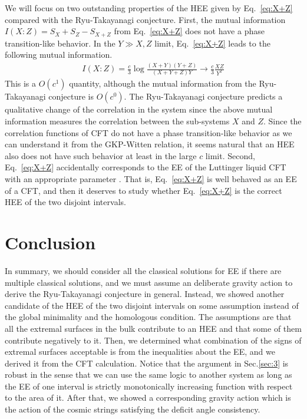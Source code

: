 \documentclass[%
 reprint,
 amsmath,amssymb,
 aps,
]{revtex4-2}
\begin{document}
    We will focus on two outstanding properties of the HEE given by Eq.~\eqref{eq:X+Z} compared with the Ryu-Takayanagi conjecture. First, the mutual information $I(X:Z) = S_X+S_Z-S_{X+Z}$ from Eq.~\eqref{eq:X+Z} does not have a phase transition-like behavior. In the $Y \gg X,Z$ limit, Eq.~\eqref{eq:X+Z} leads to the following mutual information.
\begin{align}
    I(X:Z) = \frac{c}{3}\log \frac{(X+Y)(Y+Z)}{(X+Y+Z)Y} \longrightarrow \frac{c}{3} \frac{X Z}{Y^2}
\end{align}
    This is a $O(c^1)$ quantity, although the mutual information from the Ryu-Takayanagi conjecture is $O(c^0)$. The Ryu-Takayanagi conjecture predicts a qualitative change of the correlation in the system since the above mutual information measures the correlation between the sub-systems $X$ and $Z$. Since the correlation functions of CFT do not have a phase transition-like behavior as we can understand it from the GKP-Witten relation, it seems natural that an HEE also does not have such behavior at least in the large $c$ limit. Second, Eq.~\eqref{eq:X+Z} accidentally corresponds to the EE of the Luttinger liquid CFT with an appropriate parameter \cite{Calabrese:2009ez}. That is, Eq.~\eqref{eq:X+Z} is well behaved as an EE of a CFT, and then it deserves to study whether Eq.~\eqref{eq:X+Z} is the correct HEE of the two disjoint intervals. 
    

\section{\label{sec:5} Conclusion}


    In summary, we should consider all the classical solutions for EE if there are multiple classical solutions, and we must assume an deliberate gravity action to derive the Ryu-Takayanagi conjecture in general. Instead, we showed another candidate of the HEE of the two disjoint intervals on some assumption instead of the global minimality and the homologous condition. The assumptions are that all the extremal surfaces in the bulk contribute to an HEE and that some of them contribute negatively to it. Then, we determined what combination of the signs of extremal surfaces acceptable is from the inequalities about the EE, and we derived it from the CFT calculation. Notice that the argument in Sec.\ref{sec:3} is robust in the sense that we can use the same logic to another system as long as the EE of one interval is strictly monotonically increasing function with respect to the area of it. After that, we showed a corresponding gravity action which is the action of the cosmic strings satisfying the deficit angle consistency. 
\end{document}

